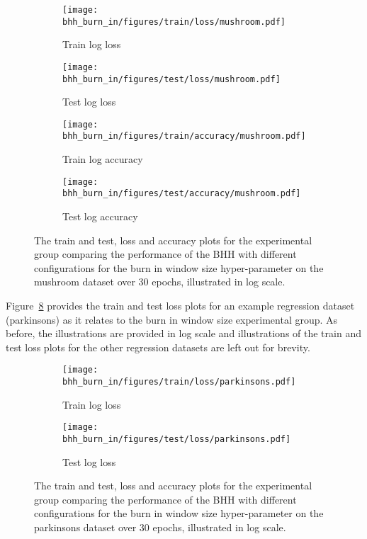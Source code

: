 \begin{figure}[htbp]
	\begin{subfigure}{0.5\textwidth}
		\centering
		\texttt{[image: bhh\_burn\_in/figures/train/loss/mushroom.pdf]}
		\caption{Train log loss}
		\label{fig:results:burn_in:figures:loss:train:mushroom}
	\end{subfigure}
	\begin{subfigure}{0.5\textwidth}
		\centering
		\texttt{[image: bhh\_burn\_in/figures/test/loss/mushroom.pdf]}
		\caption{Test log loss}
		\label{fig:results:burn_in:figures:loss:test:mushroom}
	\end{subfigure}
	\par\bigskip
	\begin{subfigure}{0.5\textwidth}
		\centering
		\texttt{[image: bhh\_burn\_in/figures/train/accuracy/mushroom.pdf]}
		\caption{Train log accuracy}
		\label{fig:results:burn_in:figures:accuracy:train:mushroom}
	\end{subfigure}
	\begin{subfigure}{0.5\textwidth}
		\centering
		\texttt{[image: bhh\_burn\_in/figures/test/accuracy/mushroom.pdf]}
		\caption{Test log accuracy}
		\label{fig:results:burn_in:figures:accuracy:test:mushroom}
	\end{subfigure}
	\par\bigskip
	\caption{The train and test, loss and accuracy plots for the experimental group comparing the performance of the \acs{BHH} with different configurations for the burn in window size hyper-parameter on the mushroom dataset over 30 epochs, illustrated in log scale.}
	\label{fig:results:burn_in:figures:mushroom}
\end{figure}

Figure~\ref{fig:results:burn_in:figures:parkinsons} provides the train and test loss plots for an example regression dataset (parkinsons) as it relates to the burn in window size experimental group. As before, the illustrations are provided in log scale and illustrations of the train and test loss plots for the other regression datasets are left out for brevity.

\begin{figure}[htbp]
	\begin{subfigure}{0.5\textwidth}
		\centering
		\texttt{[image: bhh\_burn\_in/figures/train/loss/parkinsons.pdf]}
		\caption{Train log loss}
		\label{fig:results:burn_in:figures:loss:train:parkinsons}
	\end{subfigure}
	\begin{subfigure}{0.5\textwidth}
		\centering
		\texttt{[image: bhh\_burn\_in/figures/test/loss/parkinsons.pdf]}
		\caption{Test log loss}
		\label{fig:results:burn_in:figures:loss:test:parkinsons}
	\end{subfigure}
	\par\bigskip
	\caption{The train and test, loss and accuracy plots for the experimental group comparing the performance of the \acs{BHH} with different configurations for the burn in window size hyper-parameter on the parkinsons dataset over 30 epochs, illustrated in log scale.}
	\label{fig:results:burn_in:figures:parkinsons}
\end{figure}


